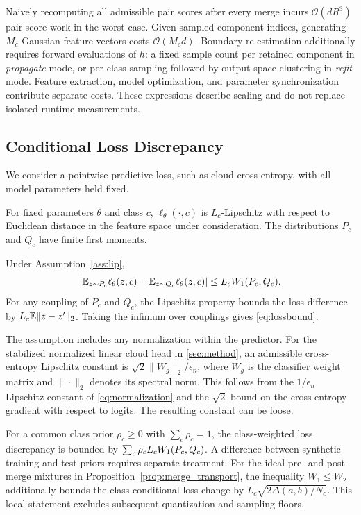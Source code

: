 Naively recomputing all admissible pair scores after every merge incurs $\mathcal O(dR^3)$ pair-score work in the worst case. Given sampled component indices, generating $M_c$ Gaussian feature vectors costs $\mathcal O(M_cd)$. Boundary re-estimation additionally requires forward evaluations of $h$: a fixed sample count per retained component in \emph{propagate} mode, or per-class sampling followed by output-space clustering in \emph{refit} mode. Feature extraction, model optimization, and parameter synchronization contribute separate costs. These expressions describe scaling and do not replace isolated runtime measurements.

\subsection{Conditional Loss Discrepancy}

We consider a pointwise predictive loss, such as cloud cross entropy, with all model parameters held fixed.

\begin{assumption}
\label{ass:lip}
For fixed parameters $\theta$ and class $c$, $\ell_\theta(\cdot,c)$ is $L_c$-Lipschitz with respect to Euclidean distance in the feature space under consideration. The distributions $P_c$ and $Q_c$ have finite first moments.
\end{assumption}

Under Assumption~\ref{ass:lip},
\begin{equation}
\label{eq:lossbound}
\left|
\mathbb{E}_{z\sim P_c}\ell_\theta(z,c)
-
\mathbb{E}_{z\sim Q_c}\ell_\theta(z,c)
\right|
\leq
L_cW_1(P_c,Q_c).
\end{equation}
For any coupling of $P_c$ and $Q_c$, the Lipschitz property bounds the loss difference by $L_c\mathbb{E}\|z-z'\|_2$. Taking the infimum over couplings gives \cref{eq:lossbound}.

The assumption includes any normalization within the predictor. For the stabilized normalized linear cloud head in \cref{sec:method}, an admissible cross-entropy Lipschitz constant is $\sqrt{2}\|W_g\|_2/\epsilon_n$, where $W_g$ is the classifier weight matrix and $\|\cdot\|_2$ denotes its spectral norm. This follows from the $1/\epsilon_n$ Lipschitz constant of \eqref{eq:normalization} and the $\sqrt{2}$ bound on the cross-entropy gradient with respect to logits. The resulting constant can be loose.

For a common class prior $\rho_c\geq0$ with $\sum_c\rho_c=1$, the class-weighted loss discrepancy is bounded by $\sum_c\rho_cL_cW_1(P_c,Q_c)$. A difference between synthetic training and test priors requires separate treatment. For the ideal pre- and post-merge mixtures in Proposition~\ref{prop:merge_transport}, the inequality $W_1\leq W_2$ additionally bounds the class-conditional loss change by $L_c\sqrt{2\Delta(a,b)/N_c}$. This local statement excludes subsequent quantization and sampling floors.

